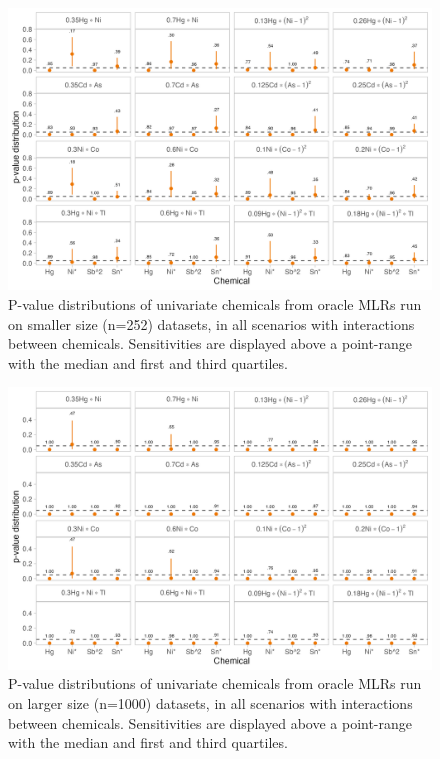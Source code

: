 \documentclass[12pt, twoside]{amherstthesis}
\begin{document}
\begin{figure}

{\centering \includegraphics[width=0.85\linewidth]{figures/ch4_osm_univ_pval} 

}

\caption{P-value distributions of univariate chemicals from oracle MLRs run on smaller size (n=252) datasets, in all scenarios with interactions between chemicals. Sensitivities are displayed above a point-range with the median and first and third quartiles.}\label{fig:osmunivp}
\end{figure}
\begin{figure}

{\centering \includegraphics[width=0.85\linewidth]{figures/ch4_olg_univ_pval} 

}

\caption{P-value distributions of univariate chemicals from oracle MLRs run on larger size (n=1000) datasets, in all scenarios with interactions between chemicals. Sensitivities are displayed above a point-range with the median and first and third quartiles.}\label{fig:olgunivp}
\end{figure}
\end{document}

